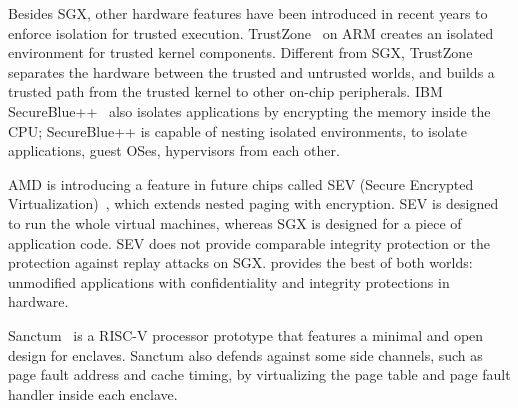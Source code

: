 Besides SGX, other hardware features have been introduced in recent years to enforce isolation for trusted execution.
TrustZone~\cite{trustzone} on ARM
creates an isolated environment for trusted kernel components. 
Different from SGX, TrustZone separates the hardware between the trusted and untrusted worlds,
and builds a trusted path from the trusted kernel to other on-chip peripherals.
IBM SecureBlue++~\cite{secureblue++} also isolates applications by encrypting the memory inside the CPU; SecureBlue++ is capable of nesting isolated environments, to isolate applications, guest OSes, hypervisors from each other.



AMD is introducing a feature in future chips called SEV (Secure Encrypted Virtualization)~\cite{amd-sme},
which extends nested paging with encryption.
SEV is designed to run the whole virtual machines, whereas SGX is designed for 
a piece of application code.
SEV does not provide comparable integrity protection or the protection against replay attacks on SGX.
\graphenesgx{} provides the best of both worlds: unmodified applications with confidentiality and integrity protections in hardware.




Sanctum~\cite{costan2016sanctum} is a RISC-V processor prototype 
that features a 
minimal and open design for enclaves.
Sanctum also defends against some side channels, such as page fault address and cache timing, by virtualizing the page table and page fault handler inside each enclave.


